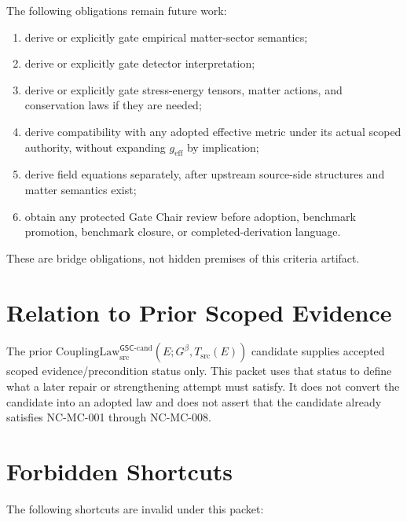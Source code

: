 \documentclass[11pt]{article}
\newcommand{\Gbeta}{G^\beta}
\newcommand{\geff}{g_{\mathrm{eff}}}
\newcommand{\CouplingLaw}{\mathrm{CouplingLaw}^{\mathsf{GSC}\mbox{-}\mathrm{cand}}_{\mathrm{src}}}
\begin{document}
The following obligations remain future work:

\begin{enumerate}[leftmargin=*]
  \item derive or explicitly gate empirical matter-sector semantics;
  \item derive or explicitly gate detector interpretation;
  \item derive or explicitly gate stress-energy tensors, matter actions, and
  conservation laws if they are needed;
  \item derive compatibility with any adopted effective metric under its
  actual scoped authority, without expanding \(\geff\) by implication;
  \item derive field equations separately, after upstream source-side
  structures and matter semantics exist;
  \item obtain any protected Gate Chair review before adoption, benchmark
  promotion, benchmark closure, or completed-derivation language.
\end{enumerate}

These are bridge obligations, not hidden premises of this criteria artifact.

\section{Relation to Prior Scoped Evidence}

The prior \(\CouplingLaw(E;\Gbeta,T_{\mathrm{src}}(E))\) candidate supplies
accepted scoped evidence/precondition status only. This packet uses that status
to define what a later repair or strengthening attempt must satisfy. It does
not convert the candidate into an adopted law and does not assert that the
candidate already satisfies NC-MC-001 through NC-MC-008.

\section{Forbidden Shortcuts}

The following shortcuts are invalid under this packet:
\end{document}
